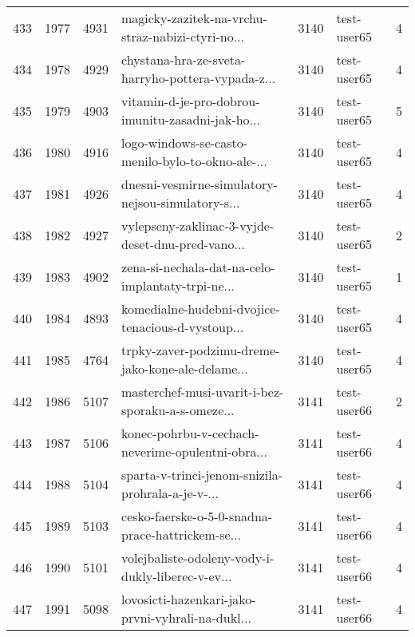 \begin{tabular}{lrrlrlr}
433  &       1977 &     4931 &  magicky-zazitek-na-vrchu-straz-nabizi-ctyri-no... &     3140 &                  test-user65 &               4 \\
434  &       1978 &     4929 &  chystana-hra-ze-sveta-harryho-pottera-vypada-z... &     3140 &                  test-user65 &               4 \\
435  &       1979 &     4903 &  vitamin-d-je-pro-dobrou-imunitu-zasadni-jak-ho... &     3140 &                  test-user65 &               5 \\
436  &       1980 &     4916 &  logo-windows-se-casto-menilo-bylo-to-okno-ale-... &     3140 &                  test-user65 &               4 \\
437  &       1981 &     4926 &  dnesni-vesmirne-simulatory-nejsou-simulatory-s... &     3140 &                  test-user65 &               4 \\
438  &       1982 &     4927 &  vylepseny-zaklinac-3-vyjde-deset-dnu-pred-vano... &     3140 &                  test-user65 &               2 \\
439  &       1983 &     4902 &  zena-si-nechala-dat-na-celo-implantaty-trpi-ne... &     3140 &                  test-user65 &               1 \\
440  &       1984 &     4893 &  komedialne-hudebni-dvojice-tenacious-d-vystoup... &     3140 &                  test-user65 &               4 \\
441  &       1985 &     4764 &  trpky-zaver-podzimu-dreme-jako-kone-ale-delame... &     3140 &                  test-user65 &               4 \\
442  &       1986 &     5107 &  masterchef-musi-uvarit-i-bez-sporaku-a-s-omeze... &     3141 &                  test-user66 &               2 \\
443  &       1987 &     5106 &  konec-pohrbu-v-cechach-neverime-opulentni-obra... &     3141 &                  test-user66 &               4 \\
444  &       1988 &     5104 &  sparta-v-trinci-jenom-snizila-prohrala-a-je-v-... &     3141 &                  test-user66 &               4 \\
445  &       1989 &     5103 &  cesko-faerske-o-5-0-snadna-prace-hattrickem-se... &     3141 &                  test-user66 &               4 \\
446  &       1990 &     5101 &  volejbaliste-odoleny-vody-i-dukly-liberec-v-ev... &     3141 &                  test-user66 &               4 \\
447  &       1991 &     5098 &  lovosicti-hazenkari-jako-prvni-vyhrali-na-dukl... &     3141 &                  test-user66 &               4 \\

\end{tabular}
